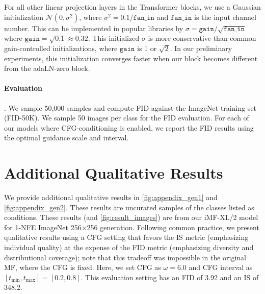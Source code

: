 For all other linear projection layers in the Transformer blocks, we use a Gaussian initialization $\mathcal{N}(0, \sigma^2)$, where $\sigma^2=0.1 / \mathtt{fan\_in}$ and $\mathtt{fan\_in}$ is the input channel number. This can be implemented in popular libraries by $\sigma=\mathtt{gain} / \sqrt{\mathtt{fan\_in}}$ where $\mathtt{gain}=\sqrt{0.1}\approx 0.32$. This initialized $\sigma$ is more conservative than common gain-controlled initializations, where $\mathtt{gain}$ is 1 or $\sqrt{2}$. In our preliminary experiments, this initialization converges faster when our block becomes different from the adaLN-zero block.

\paragraph{Evaluation}.
We sample 50,000 samples and compute FID against the ImageNet training set (\ie FID-50K). We sample 50 images per class for the FID evaluation. For each of our models where CFG-conditioning is enabled, we report the FID results using the optimal guidance scale and interval.

\section{Additional Qualitative Results} 
\label{app:vis}
We provide additional qualitative results in \cref{fig:appendix_gen1} and \cref{fig:appendix_gen2}.
These results are uncurated samples of the classes listed as conditions.
These results (and \cref{fig:result_images}) are from our iMF-XL/2 model for 1-NFE ImageNet 256$\times$256 generation.
Following common practice, we present qualitative results using a CFG setting that favors the IS metric (emphasizing individual quality) at the expense of the FID metric (emphasizing diversity and distributional coverage); note that this tradeoff was impossible in the original MF, where the CFG is fixed.
Here, we set CFG as $\omega=6.0$ and CFG interval as $[t_\text{min}, t_\text{max}]=[0.2,0.8]$. This evaluation setting has an FID of 3.92 and an IS of 348.2.